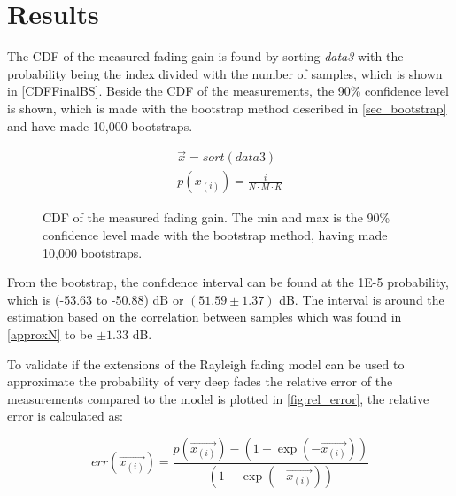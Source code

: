 \section{Results}

The \gls{CDF} of the measured fading gain is found by sorting \textit{data3} with the probability being the index divided with the number of samples, which is shown in \autoref{CDFFinalBS}. Beside the CDF of the measurements, the 90\% confidence level is shown, which is made with the bootstrap method described in \autoref{sec_bootstrap} and have made 10,000 bootstraps. 

\begin{align}
\overrightarrow{x} = sort(data3)\\
p(x_{(i)}) = \frac{i}{N\cdot M\cdot K} 
\end{align} 
\begin{where}
\end{where}

\begin{figure}[H]
\centering

\caption{CDF of the measured fading gain. The min and max is the 90\% confidence level made with the bootstrap method, having made 10,000 bootstraps.}
\label{CDFFinalBS}
\end{figure}

From the bootstrap, the confidence interval can be found at the 1E-5 probability, which is (-53.63 to -50.88) dB or $(51.59\pm 1.37)$ dB. The interval is around the estimation based on the correlation between samples which was found in \autoref{approxN} to be $\pm 1.33$ dB.


To validate if the extensions of the Rayleigh fading model can be used to approximate the probability of very deep fades the relative error of the measurements compared to the model is plotted in \autoref{fig:rel_error}, the relative error is calculated as:

\begin{equation}
err(\overrightarrow{x_{(i)}}) = \frac{p(\overrightarrow{x_{(i)}})-\left(1-\exp(-\overrightarrow{x_{(i)}})\right)}{(1-\exp(-\overrightarrow{x_{(i)}}))}
\end{equation}
\begin{where}
\end{where}

